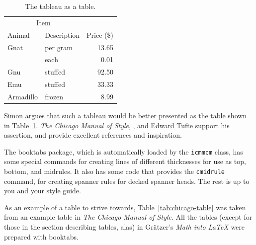 \documentclass{icmmcm}
\newcommand{\bslash}{\symbol{'134}}%
\newcommand{\bsl}{{\texttt{\bslash}}}
\newcommand{\com}[1]{\bsl\texttt{#1}\xspace}
\newcommand{\file}[1]{\texttt{#1}\xspace}
\newcommand{\package}[1]{\textsf{#1}\xspace}
\begin{document}
{\begin{table}[htbp]
  \begin{center}
    \begin{tabular}{@{}llr@{}} \toprule
      \multicolumn{2}{c}{Item} \\ \cmidrule(r){1-2}
      Animal    & Description & Price (\$)\\ \midrule    
      Gnat      & per gram    & 13.65 \\                 
                & each        & 0.01 \\                  
      Gnu       & stuffed     & 92.50 \\                 
      Emu       & stuffed     & 33.33 \\                 
      Armadillo & frozen      & 8.99 \\ \bottomrule
    \end{tabular}
  \end{center}
  \caption[The tableau as a table]{The tableau as a table.}%
  \label{tab:tableau-table}
\end{table}

Simon argues that such a tableau would be better presented as the
table shown in Table~\ref{tab:tableau-table}.  \emph{The Chicago
  Manual of Style}, \cite{chicago}, and Edward Tufte
\citeyearpar{tufte-vdq} support his assertion, and provide excellent
references and inspiration.

The \package{booktabs} package, which is automatically loaded by the
\file{icmmcm} class, has some special commands for creating lines of
different thicknesses for use as top, bottom, and midrules.  It also
has some code that provides the \com{cmidrule} command, for creating
spanner rules for decked spanner heads.  The rest is up to you and
your style guide.

As an example of a table to strive towards,
Table~\ref{tab:chicago-table} was taken from an example table in
\emph{The Chicago Manual of Style}.  All the tables (except for those
in the section describing tables, alas) in Gr\"{a}tzer's \emph{Math
  into \LaTeX} were prepared with \package{booktabs}.

}
\end{document}
